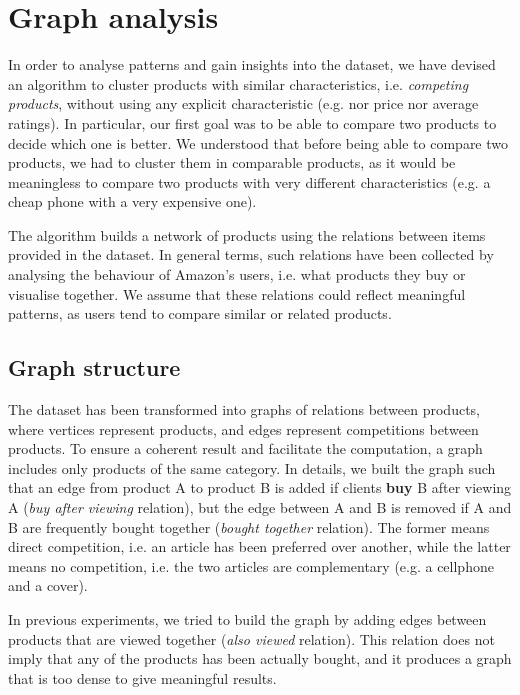 \documentclass[11pt]{article}
\begin{document}
\section{Graph analysis}
\label{sec:graphanalysis}
In order to analyse patterns and gain insights into the dataset, we have devised an algorithm to cluster products with similar characteristics, i.e. \textit{competing products}, without using any explicit characteristic (e.g. nor price nor average ratings). In particular, our first goal was to be able to compare two products to decide which one is better.  We understood that before being able to compare two products, we had to cluster them in comparable products, as it would be meaningless to compare two products with very different characteristics (e.g. a cheap phone with a very expensive one). 

The algorithm builds a network of products using the relations between items provided in the dataset. In general terms, such relations have been collected by analysing the behaviour of Amazon's users, i.e. what products they buy or visualise together. We assume that these relations could reflect meaningful patterns, as users tend to compare similar or related products.

\subsection{Graph structure}
The dataset has been transformed into graphs of relations between products, where vertices represent products, and edges represent competitions between products. To ensure a coherent result and facilitate the computation, a graph includes only products of the same category. In details, we built the graph such that an edge from product A to product B is added if clients \textbf{buy} B after viewing A (\textit{buy after viewing} relation), but the edge between A and B is removed if A and B are frequently bought together (\textit{bought together} relation). The former means direct competition, i.e. an article has been preferred over another, while the latter means no competition, i.e. the two articles are complementary (e.g. a cellphone and a cover).

In previous experiments, we tried to build the graph by adding edges between products that are viewed together (\textit{also viewed} relation). This relation does not imply that any of the products has been actually bought, and it produces a graph that is too dense to give meaningful results. %
\end{document}
